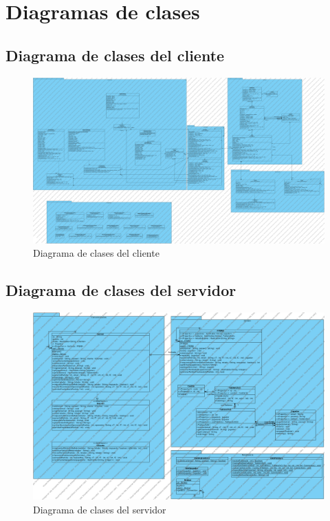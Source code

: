 \section{Diagramas de clases}
\subsection{Diagrama de clases del cliente}
\begin{landscape}
 \begin{figure}[h]
 \centering
 \includegraphics[scale=0.2]{img/ddc_Cliente.png}
 \caption{Diagrama de clases del cliente}
 \label{ddc_cliente}
 \end{figure}
\end{landscape}

\subsection{Diagrama de clases del servidor}
 \begin{figure}[h]
 \centering
 \includegraphics[scale=0.3]{img/ddc_Servidor.png}
 \caption{Diagrama de clases del servidor}
 \label{ddc_servidor}
 \end{figure}

